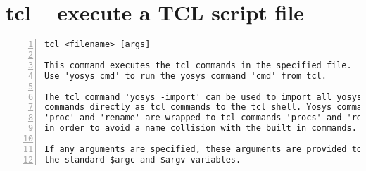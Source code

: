 \section{tcl -- execute a TCL script file}
\label{cmd:tcl}
\begin{lstlisting}[numbers=left,frame=single]
    tcl <filename> [args]

This command executes the tcl commands in the specified file.
Use 'yosys cmd' to run the yosys command 'cmd' from tcl.

The tcl command 'yosys -import' can be used to import all yosys
commands directly as tcl commands to the tcl shell. Yosys commands
'proc' and 'rename' are wrapped to tcl commands 'procs' and 'renames'
in order to avoid a name collision with the built in commands.

If any arguments are specified, these arguments are provided to the script via
the standard $argc and $argv variables.
\end{lstlisting}

